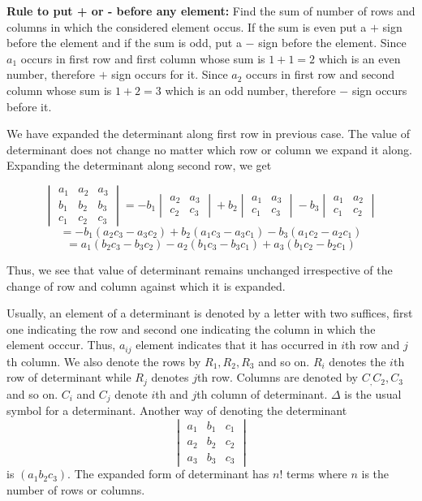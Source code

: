 \textbf{Rule to put + or - before any element:} Find the sum of number of rows and columns in which the considered element
occus. If the sum is even put a $+$ sign before the element and if the sum is odd, put a $-$ sign before the element. Since $a_1$
occurs in first row and first column whose sum is $1 + 1 = 2$ which is an even number, therefore $+$ sign occurs for it. Since
$a_2$ occurs in first row and second column whose sum is $1+ 2 = 3$ which is an odd number, therefore $-$ sign occurs before it.

We have expanded the determinant along first row in previous case. The value of determinant does not change no matter which row or
column we expand it along. Expanding the determinant along second row, we get

$$\begin{vmatrix}a_1 & a_2 & a_3\\b_1 & b_2 & b_3\\c_1 & c_2 & c_3\end{vmatrix}= -b_1\begin{vmatrix}a_2 & a_3\\c_2 &
  c_3\end{vmatrix} + b_2\begin{vmatrix}a_1 & a_3\\c_1 & c_3\end{vmatrix}- b_3\begin{vmatrix}a_1 & a_2\\c_1 & c_2\end{vmatrix}$$
$$= -b_1(a_2c_3 - a_3c_2) + b_2(a_1c_3 - a_3c_1) - b_3(a_1c_2 - a_2c_1)$$
$$= a_1(b_2c_3 - b_3c_2)-a_2(b_1c_3-b_3c_1) + a_3(b_1c_2-b_2c_1)$$

Thus, we see that value of determinant remains unchanged irrespective of the change of row and column against which it is expanded.

Usually, an element of a determinant is denoted by a letter with two suffices, first one indicating the row and second one
indicating the column in which the element occcur. Thus, $a_{ij}$ element indicates that it has occurred in $i$th row and $j$th
column. We also denote the rows by $R_1, R_2, R_3$ and so on. $R_i$ denotes the $i$th row of determinant while $R_j$ denotes $j$th
row. Columns are denoted by $C_, C_2, C_3$ and so on. $C_i$ and $C_j$ denote $i$th and $j$th column of determinant. $\Delta$ is the
usual symbol for a determinant. Another way of denoting the determinant $$\begin{vmatrix}a_1&b_1&c_1\\a_2&b_2&c_2\\a_3&b_3&c_3
\end{vmatrix}$$ is $(a_1b_2c_3)$. The expanded form of determinant has $n!$ terms where $n$ is the number of rows or columns.

